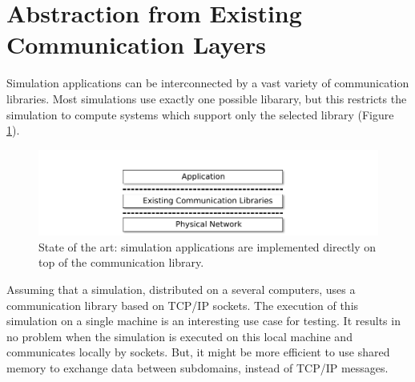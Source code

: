 
\section{Abstraction from Existing Communication Layers}
\label{sec:comm_abstraction}

Simulation applications can be interconnected by a vast variety of
communication libraries. Most simulations use exactly one possible
libarary, but this restricts the simulation to compute systems which
support only the selected library (Figure
\ref{fig:design_state_of_the_art}).

\begin{figure}[H]
  \centering \includegraphics[width=\textwidth]{graphics/30_design_state_of_the_art}
  \caption{State of the art: simulation applications are implemented directly
  on top of the communication library.}
  \label{fig:design_state_of_the_art}
\end{figure}


Assuming that a simulation, distributed on a several computers, uses a
communication library based on TCP/IP sockets. The execution of this
simulation on a single machine is an interesting use case for
testing. It results in no problem when the simulation is executed on
this local machine and communicates locally by sockets.  But, it might
be more efficient to use shared memory to exchange data between
subdomains, instead of TCP/IP messages.


